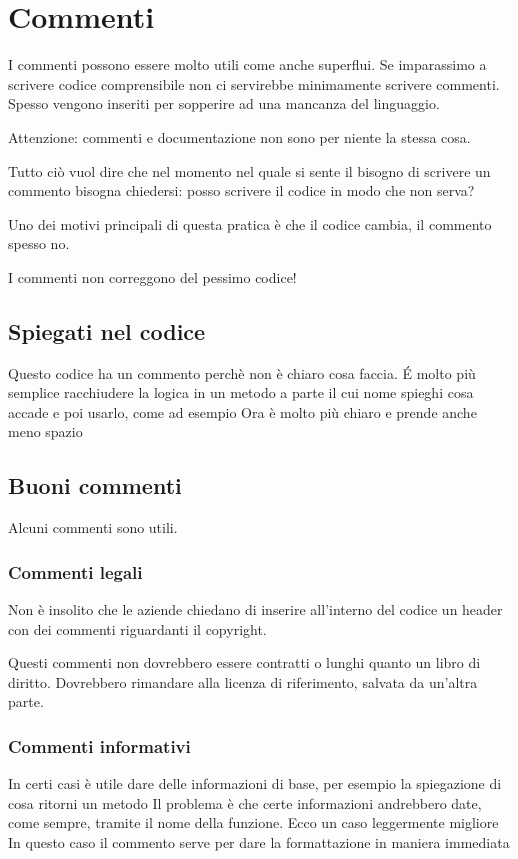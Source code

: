 \documentclass[11pt,a4paper]{book}
\begin{document}
\chapter{Commenti}
I commenti possono essere molto utili come anche superflui. Se imparassimo a scrivere codice comprensibile non ci servirebbe minimamente scrivere commenti. Spesso vengono inseriti per sopperire ad una mancanza del linguaggio.

Attenzione: commenti e documentazione non sono per niente la stessa cosa.

Tutto ciò vuol dire che nel momento nel quale si sente il bisogno di scrivere un commento bisogna chiedersi: posso scrivere il codice in modo che non serva?

Uno dei motivi principali di questa pratica è che il codice cambia, il commento spesso no.

I commenti non correggono del pessimo codice!

\section{Spiegati nel codice}
\label{code: 023}
Questo codice ha un commento perchè non è chiaro cosa faccia. É molto più semplice racchiudere la logica in un metodo a parte il cui nome spieghi cosa accade e poi usarlo, come ad esempio
\label{code: 024}
Ora è molto più chiaro e prende anche meno spazio

\section{Buoni commenti}
Alcuni commenti sono utili.

\subsection{Commenti legali}
Non è insolito che le aziende chiedano di inserire all'interno del codice un header con dei commenti riguardanti il copyright.

Questi commenti non dovrebbero essere contratti o lunghi quanto un libro di diritto. Dovrebbero rimandare alla licenza di riferimento, salvata da un'altra parte.

\subsection{Commenti informativi}
In certi casi è utile dare delle informazioni di base, per esempio la spiegazione di cosa ritorni un metodo
\label{code: 025}
Il problema è che certe informazioni andrebbero date, come sempre, tramite il nome della funzione. Ecco un caso leggermente migliore
\label{code: 026}
In questo caso il commento serve per dare la formattazione in maniera immediata
\end{document}

